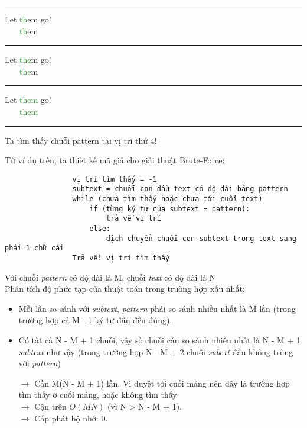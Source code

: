 \documentclass[a4paper,11pt]{article}
\begin{document}
\begin{enumerate}
			\vspace*{2mm}
			\hrule
			Let \textcolor{ForestGreen}{th}em go!\\
			\textcolor{white}{Let }\textcolor{ForestGreen}{th}em
			
			\vspace*{2mm}
			\hrule
			Let \textcolor{ForestGreen}{the}m go!\\
			\textcolor{white}{Let }\textcolor{ForestGreen}{the}m
						
			\vspace*{2mm}
			\hrule
			Let \textcolor{ForestGreen}{them} go!\\
			\textcolor{white}{Let }\textcolor{ForestGreen}{them}
			\vspace*{2mm}
			\hrule

			Ta tìm thấy chuỗi pattern tại vị trí thứ 4!
			
			Từ ví dụ trên, ta thiết kế mã giả cho giải thuật Brute-Force:

			\begin{lstlisting}
				vị trí tìm thấy = -1
				subtext = chuỗi con đầu text có độ dài bằng pattern
				while (chưa tìm thấy hoặc chưa tới cuối text)
					if (từng ký tự của subtext = pattern):
						trả về vị trí
					else:
						dịch chuyển chuỗi con subtext trong text sang phải 1 chữ cái
				Trả về: vị trí tìm thấy
					\end{lstlisting}
			
			Với chuỗi \textit{pattern} có độ dài là M, chuỗi \textit{text} có độ dài là N \\
			Phân tích độ phức tạp của thuật toán trong trường hợp xấu nhất:
			\begin{itemize}
				\item Mỗi lần so sánh với \textit{subtext}, \textit{pattern} phải so sánh nhiều nhất là M lần (trong trường hợp cả M - 1 ký tự đầu đều đúng).
				\item Có tất cả N - M + 1 chuỗi, vậy số chuỗi cần so sánh nhiều nhất là N - M + 1 \textit{subtext} như vậy (trong trường hợp N - M + 2 chuỗi \textit{subext} đầu không trùng với \textit{pattern})
				
				$\to$ Cần M(N - M + 1) lần. Vì duyệt tới cuối mảng nên đây là trường hợp tìm thấy ở cuối mảng, hoặc không tìm thấy\\
				$\to$ Cận trên $O(MN)$ (vì N > N - M + 1). \\
				$\to$ Cấp phát bộ nhớ: 0.
			\end{itemize}


\end{enumerate}
\end{document}
